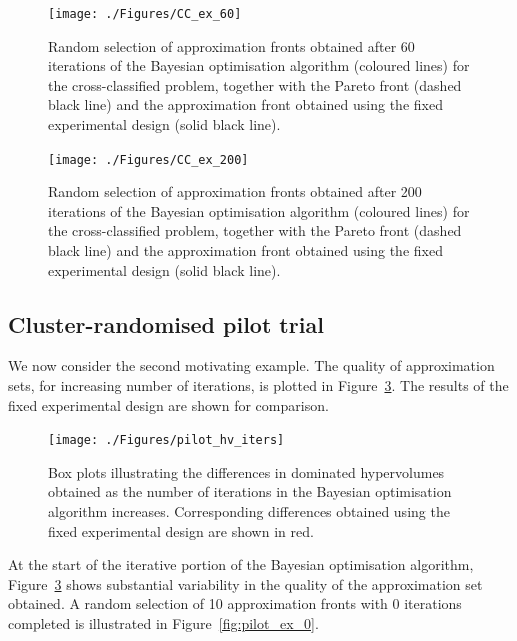 \documentclass{article} %
\begin{document}
\begin{figure}
\centering
\texttt{[image: ./Figures/CC\_ex\_60]}
\caption{Random selection of approximation fronts obtained after 60 iterations of the Bayesian optimisation algorithm (coloured lines) for the cross-classified problem, together with the Pareto front (dashed black line) and the approximation front obtained using the fixed experimental design (solid black line).}
\label{fig:CC_ex_60}
\end{figure}

\begin{figure}
\centering
\texttt{[image: ./Figures/CC\_ex\_200]}
\caption{Random selection of approximation fronts obtained after 200 iterations of the Bayesian optimisation algorithm (coloured lines) for the cross-classified problem, together with the Pareto front (dashed black line) and the approximation front obtained using the fixed experimental design (solid black line).}
\label{fig:CC_ex_200}
\end{figure}


\subsection{Cluster-randomised pilot trial}

We now consider the second motivating example. The quality of approximation sets, for increasing number of iterations, is plotted in Figure~\ref{fig:pilot_hv_iters}. The results of the fixed experimental design are shown for comparison.

\begin{figure}
\centering
\texttt{[image: ./Figures/pilot\_hv\_iters]}
\caption{Box plots illustrating the differences in dominated hypervolumes obtained as the number of iterations in the Bayesian optimisation algorithm increases. Corresponding differences obtained using the fixed experimental design are shown in red.}
\label{fig:pilot_hv_iters}
\end{figure}

At the start of the iterative portion of the Bayesian optimisation algorithm, Figure~\ref{fig:pilot_hv_iters} shows substantial variability in the quality of the approximation set obtained. A random selection of 10 approximation fronts with 0 iterations completed is illustrated in Figure~\ref{fig:pilot_ex_0}.
\end{document}
